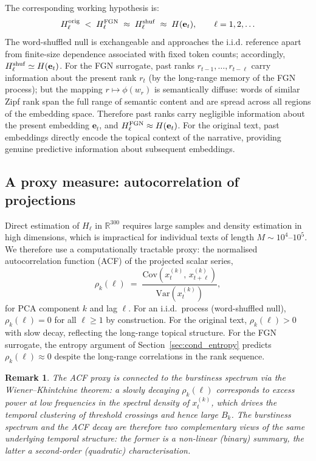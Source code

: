 \documentclass[12pt,a4paper]{article}
\newtheorem{remark}{Remark}
\newcommand{\bk}{B_k}
\newcommand{\xtk}{x_t^{(k)}}
\newcommand{\et}{\mathbf{e}_t}
\newcommand{\R}{\mathbb{R}}
\begin{document}
The corresponding working hypothesis is:
\begin{equation}
  H_\ell^{\rm orig} \;<\; H_\ell^{\rm FGN}
  \;\approx\; H_\ell^{\rm shuf} \;\approx\; H(\et),
  \qquad \ell = 1, 2, \ldots
  \label{eq:entropy_ordering}
\end{equation}
The word-shuffled null is exchangeable and approaches the i.i.d.
reference apart from finite-size dependence associated with fixed token
counts; accordingly, $H_\ell^{\rm shuf} \simeq H(\et)$.
For the FGN surrogate, past ranks $r_{t-1}, \ldots, r_{t-\ell}$
carry information about the present rank $r_t$ (by the long-range
memory of the FGN process); but the mapping $r \mapsto \phi(w_r)$ is
semantically diffuse: words of similar Zipf rank span the full range
of semantic content and are spread across all regions of the embedding
space.
Therefore past ranks carry negligible information about the present
embedding $\et$, and $H_\ell^{\rm FGN} \approx H(\et)$.
For the original text, past embeddings directly encode the topical
context of the narrative, providing genuine predictive information
about subsequent embeddings.


\subsection{A proxy measure: autocorrelation of projections}
\label{sec:autocorr_proxy}

Direct estimation of $H_\ell$ in $\R^{300}$ requires large samples and
density estimation in high dimensions, which is impractical for
individual texts of length $M \sim 10^4$--$10^5$.
We therefore use a computationally tractable proxy: the normalised
autocorrelation function (ACF) of the projected scalar series,
\begin{equation}
  \rho_k(\ell) \;=\;
  \frac{\mathrm{Cov}\!\left(\xtk,\, x_{t+\ell}^{(k)}\right)}
       {\mathrm{Var}\!\left(\xtk\right)},
  \label{eq:autocorr}
\end{equation}
for PCA component $k$ and lag $\ell$.
For an i.i.d.\ process (word-shuffled null), $\rho_k(\ell) = 0$ for
all $\ell \geq 1$ by construction.
For the original text, $\rho_k(\ell) > 0$ with slow decay, reflecting
the long-range topical structure.
For the FGN surrogate, the entropy argument of
Section~\ref{sec:cond_entropy} predicts $\rho_k(\ell) \approx 0$
despite the long-range correlations in the rank sequence.

\begin{remark}
  The ACF proxy is connected to the burstiness spectrum via the
  Wiener--Khintchine theorem: a slowly decaying $\rho_k(\ell)$
  corresponds to excess power at low frequencies in the spectral
  density of $x_t^{(k)}$, which drives the temporal clustering of
  threshold crossings and hence large $\bk$.
  The burstiness spectrum and the ACF decay are therefore two
  complementary views of the same underlying temporal structure:
  the former is a non-linear (binary) summary, the latter a
  second-order (quadratic) characterisation.
\end{remark}
\end{document}

